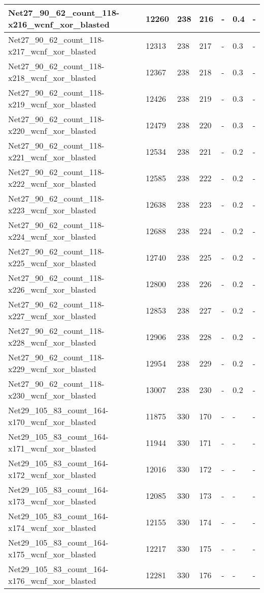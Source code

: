 \begin{scriptsize}
\begin{longtable}{|p{5cm}|l|l|l|l|l|l|}
Net27\_90\_62\_count\_118-x216\_wcnf\_xor\_blasted&12260&238&216&-&0.4&- \\ \hline 
Net27\_90\_62\_count\_118-x217\_wcnf\_xor\_blasted&12313&238&217&-&0.3&- \\ \hline 
Net27\_90\_62\_count\_118-x218\_wcnf\_xor\_blasted&12367&238&218&-&0.3&- \\ \hline 
Net27\_90\_62\_count\_118-x219\_wcnf\_xor\_blasted&12426&238&219&-&0.3&- \\ \hline 
Net27\_90\_62\_count\_118-x220\_wcnf\_xor\_blasted&12479&238&220&-&0.3&- \\ \hline 
Net27\_90\_62\_count\_118-x221\_wcnf\_xor\_blasted&12534&238&221&-&0.2&- \\ \hline 
Net27\_90\_62\_count\_118-x222\_wcnf\_xor\_blasted&12585&238&222&-&0.2&- \\ \hline 
Net27\_90\_62\_count\_118-x223\_wcnf\_xor\_blasted&12638&238&223&-&0.2&- \\ \hline 
Net27\_90\_62\_count\_118-x224\_wcnf\_xor\_blasted&12688&238&224&-&0.2&- \\ \hline 
Net27\_90\_62\_count\_118-x225\_wcnf\_xor\_blasted&12740&238&225&-&0.2&- \\ \hline 
Net27\_90\_62\_count\_118-x226\_wcnf\_xor\_blasted&12800&238&226&-&0.2&- \\ \hline 
Net27\_90\_62\_count\_118-x227\_wcnf\_xor\_blasted&12853&238&227&-&0.2&- \\ \hline 
Net27\_90\_62\_count\_118-x228\_wcnf\_xor\_blasted&12906&238&228&-&0.2&- \\ \hline 
Net27\_90\_62\_count\_118-x229\_wcnf\_xor\_blasted&12954&238&229&-&0.2&- \\ \hline 
Net27\_90\_62\_count\_118-x230\_wcnf\_xor\_blasted&13007&238&230&-&0.2&- \\ \hline 
Net29\_105\_83\_count\_164-x170\_wcnf\_xor\_blasted&11875&330&170&-&-&- \\ \hline 
Net29\_105\_83\_count\_164-x171\_wcnf\_xor\_blasted&11944&330&171&-&-&- \\ \hline 
Net29\_105\_83\_count\_164-x172\_wcnf\_xor\_blasted&12016&330&172&-&-&- \\ \hline 
Net29\_105\_83\_count\_164-x173\_wcnf\_xor\_blasted&12085&330&173&-&-&- \\ \hline 
Net29\_105\_83\_count\_164-x174\_wcnf\_xor\_blasted&12155&330&174&-&-&- \\ \hline 
Net29\_105\_83\_count\_164-x175\_wcnf\_xor\_blasted&12217&330&175&-&-&- \\ \hline 
Net29\_105\_83\_count\_164-x176\_wcnf\_xor\_blasted&12281&330&176&-&-&- \\ \hline 

\end{longtable}
\end{scriptsize}
